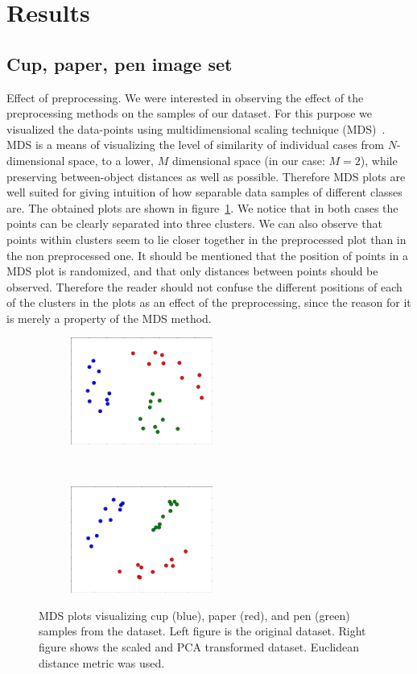 \documentclass{article}
\newcommand{\enterProblemHeader}[1]{
}
\newcommand{\exitProblemHeader}[1]{
}
\newcounter{homeworkProblemCounter} %
\newcommand{\homeworkProblemName}{}
\newenvironment{homeworkProblem}[1][Problem \arabic{homeworkProblemCounter}]{ %
\stepcounter{homeworkProblemCounter} %
\renewcommand{\homeworkProblemName}{#1} %
\section{\homeworkProblemName} %
\enterProblemHeader{\homeworkProblemName} %
}{
\exitProblemHeader{\homeworkProblemName} %
}
\newcommand{\homeworkSectionName}{}
\newenvironment{homeworkSection}[1]{ %
\renewcommand{\homeworkSectionName}{#1} %
\subsection{\homeworkSectionName} %
\enterProblemHeader{\homeworkProblemName\ [\homeworkSectionName]} %
}{
\enterProblemHeader{\homeworkProblemName} %
}
\begin{document}
\begin{homeworkProblem}[Results]

\begin{homeworkSection}{Cup, paper, pen image set}

\begin{paragraph}{Effect of preprocessing.}
We were interested in observing the effect of the preprocessing methods on the samples of our dataset. For this purpose we visualized the data-points using multidimensional scaling technique (MDS)~\cite{borg2005modern}. MDS is a means of visualizing the level of similarity of individual cases from $N$-dimensional space, to a lower, $M$ dimensional space (in our case: $M=2$), while preserving between-object distances as well as possible. Therefore MDS plots are well suited for giving intuition of how separable data samples of different classes are. The obtained plots are shown in figure~\ref{fig:mds_preprocessing}. We notice that in both cases the points can be clearly separated into three clusters. We can also observe that points within clusters seem to lie closer together in the preprocessed plot than in the non preprocessed one. It should be mentioned that the position of points in a MDS plot is randomized, and that only distances between points should be observed. Therefore the reader should not confuse the different positions of each of the clusters in the plots as an effect of the preprocessing, since the reason for it is merely a property of the MDS method.

\begin{figure}[t]
    \centering
    \begin{subfigure}[t]{0.4\textwidth}
        \centering
        \includegraphics[height=3.5cm]{img/mds_no_preprocessing}
    \end{subfigure}
   ~
    \begin{subfigure}[t]{0.4\textwidth}
        \centering
        \includegraphics[height=3.5cm]{img/mds_preprocessing}
        \end{subfigure}
  \caption{MDS plots visualizing cup (blue), paper (red), and pen (green) samples from the dataset. Left figure is the original dataset. Right figure shows the scaled and PCA transformed dataset. Euclidean distance metric was used.}
  \label{fig:mds_preprocessing}
\end{figure}


\end{paragraph}
\end{homeworkSection}
\end{homeworkProblem}
\end{document}
